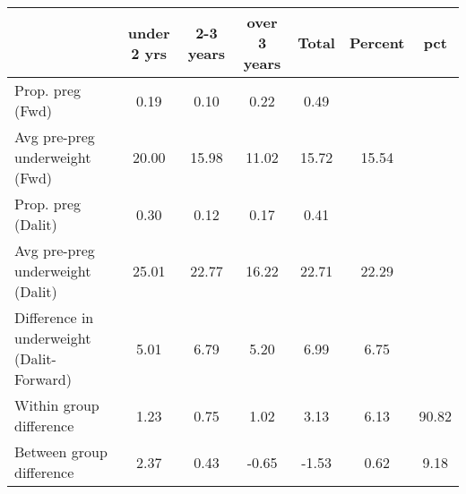 \begin{tabular}{l*{6}{c}}
\toprule
            &\multicolumn{1}{c}{under 2 yrs}&\multicolumn{1}{c}{2-3 years}&\multicolumn{1}{c}{over 3 years}&\multicolumn{1}{c}{Total}&\multicolumn{1}{c}{Percent}&\multicolumn{1}{c}{pct}\\
\midrule
\midrule
Prop. preg (Fwd)&        0.19&        0.10&        0.22&        0.49&            &            \\
Avg pre-preg underweight (Fwd)&       20.00&       15.98&       11.02&       15.72&       15.54&            \\
Prop. preg (Dalit)&        0.30&        0.12&        0.17&        0.41&            &            \\
Avg pre-preg underweight (Dalit)&       25.01&       22.77&       16.22&       22.71&       22.29&            \\
Difference in underweight (Dalit-Forward)&        5.01&        6.79&        5.20&        6.99&        6.75&            \\
Within group difference&        1.23&        0.75&        1.02&        3.13&        6.13&       90.82\\
Between group difference&        2.37&        0.43&       -0.65&       -1.53&        0.62&        9.18\\
\bottomrule
\end{tabular}
